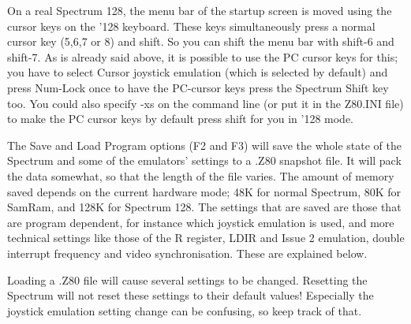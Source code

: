    On a real Spectrum 128, the menu bar of the startup screen is moved
    using the cursor keys on the '128 keyboard.  These keys simultaneously
    press a normal cursor key (5,6,7 or 8) and shift.  So you can shift the
    menu bar with shift-6 and shift-7.  As is already said above, it is
    possible to use the PC cursor keys for this; you have to select Cursor
    joystick emulation (which is selected by default) and press Num-Lock
    once to have the PC-cursor keys press the Spectrum Shift key too.  You
    could also specify -xs on the command line (or put it in the Z80.INI
    file) to make the PC cursor keys by default press shift for you in '128
    mode.

    The Save and Load Program options (F2 and F3) will save the whole state
    of the Spectrum and some of the emulators' settings to a .Z80 snapshot
    file.  It will pack the data somewhat, so that the length of the file
    varies.  The amount of memory saved depends on the current hardware
    mode; 48K for normal Spectrum, 80K for SamRam, and 128K for Spectrum
    128.  The settings that are saved are those that are program dependent,
    for instance which joystick emulation is used, and more technical
    settings like those of the R register, LDIR and Issue 2 emulation,
    double interrupt frequency and video synchronisation.  These are
    explained below.

    Loading a .Z80 file will cause several settings to be changed. Resetting
    the Spectrum will not reset these settings to their default values!
    Especially the joystick emulation setting change can be confusing, so
    keep track of that.

